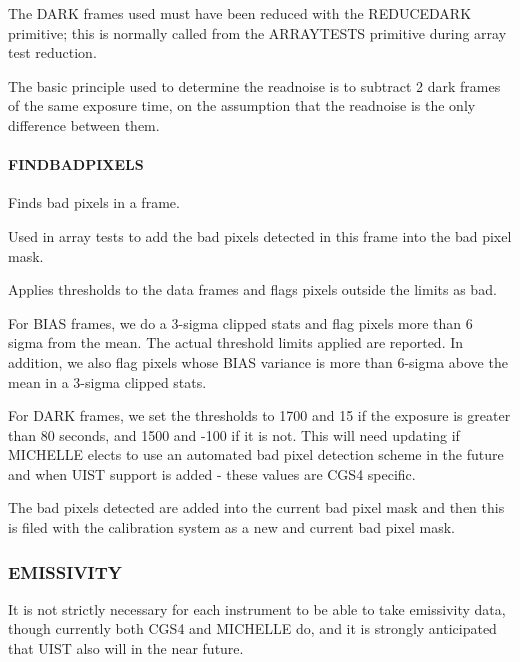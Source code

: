 \documentclass[twoside,11pt]{article}
\renewcommand{\_}{\texttt{\symbol{95}}}
\begin{document}
The DARK frames used must have been reduced with the \_REDUCE\_DARK\_
primitive; this is normally called from the \_ARRAY\_TESTS\_ primitive
during array test reduction.



The basic principle used to determine the readnoise is to subtract 2
dark frames of the same exposure time, on the assumption that the
readnoise is the only difference between them.


\paragraph{\_FIND\_BAD\_PIXELS\_\label{_FIND_BAD_PIXELS_}}


Finds bad pixels in a frame.


\mbox{}


Used in array tests to add the bad pixels detected in this frame into the 
bad pixel mask.



Applies thresholds to the data frames and flags pixels outside
the limits as bad.



For BIAS frames, we do a 3-sigma clipped stats and flag pixels more
than 6 sigma from the mean. The actual threshold limits applied are
reported. In addition, we also flag pixels whose BIAS variance is more
than 6-sigma above the mean in a 3-sigma clipped stats.



For DARK frames, we set the thresholds to 1700 and 15 if the exposure
is greater than 80 seconds, and 1500 and -100 if it is not. This will
need updating if MICHELLE elects to use an automated bad pixel
detection scheme in the future and when UIST support is added - these
values are CGS4 specific.



The bad pixels detected are added into the current bad pixel mask and
then this is filed with the calibration system as a new and current
bad pixel mask.


\subsubsection{EMISSIVITY}

It is not strictly necessary for each instrument to be able to take
emissivity data, though currently both CGS4 and MICHELLE do, and it is
strongly anticipated that UIST also will in the near future.
\end{document}
